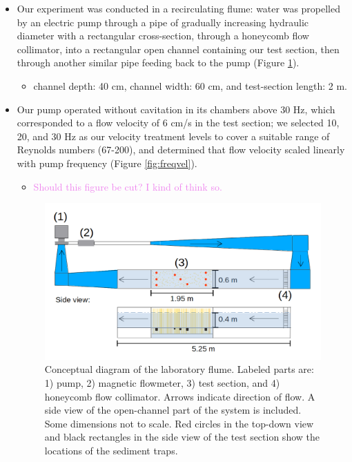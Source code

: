 \documentclass{article}
\begin{document}
\begin{itemize}
    \item Our experiment was conducted in a recirculating flume: water was propelled by an electric pump through a pipe of gradually increasing hydraulic diameter with a rectangular cross-section, through a honeycomb flow collimator, into a rectangular open channel containing our test section, then through another similar pipe feeding back to the pump (Figure \ref{fig:floorplan}).
    \begin{itemize}
        \item channel depth: 40 cm, channel width: 60 cm, and test-section length: 2 m.
    \end{itemize}
    \item Our pump operated without cavitation in its chambers above 30 Hz, which corresponded to a flow velocity of 6 cm/s in the test section; we selected 10, 20, and 30 Hz as our velocity treatment levels to cover a suitable range of Reynolds numbers (67-200), and determined that flow velocity scaled linearly with pump frequency (Figure \ref{fig:freqvel}).
    \begin{itemize}
        \item \textcolor{violet}{Should this figure be cut? I kind of think so.}
    \end{itemize}

\begin{figure}[htbp]
\includegraphics[width=15cm]{../pics/flume_with_sedtraps.png}
\centering
\caption{Conceptual diagram of the laboratory flume. Labeled parts are: 1) pump, 2) magnetic flowmeter, 3) test section, and 4) honeycomb flow collimator. Arrows indicate direction of flow. A side view of the open-channel part of the system is included. Some dimensions not to scale. Red circles in the top-down view and black rectangles in the side view of the test section show the locations of the sediment traps.}
\label{fig:floorplan}
\end{figure}


\end{itemize}
\end{document}
